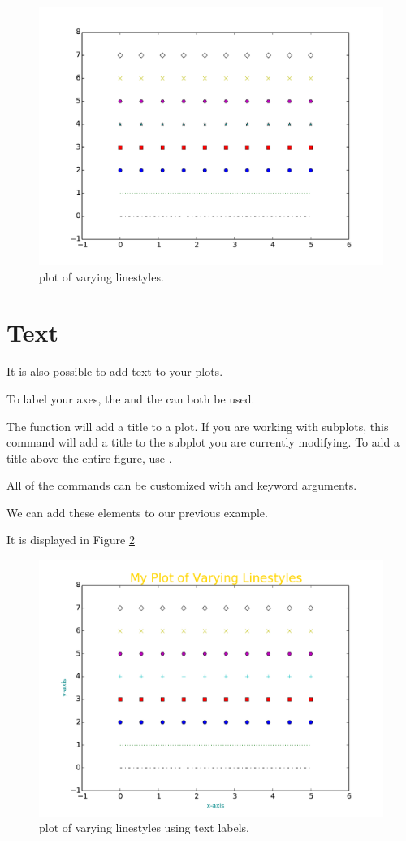 \begin{figure} 
\includegraphics[width=\textwidth]{linestyle.pdf}
\caption{plot of varying linestyles.}
\label{linestyle} 
\end{figure}


\section*{Text}
It is also possible to add text to your plots. 

To label your axes, the  and the  can both be used. 

The function  will add a title to a plot.
If you are working with subplots, this command will add a title to the subplot you are currently modifying.
To add a title above the entire figure, use .


All of the  commands can be customized with  and  keyword arguments. 

We can add these elements to our previous example. 

It is displayed in Figure \ref{text}


\begin{figure} 
\includegraphics[width=\textwidth]{text.pdf}
\caption{plot of varying linestyles using text labels.}
\label{text} 
\end{figure}

